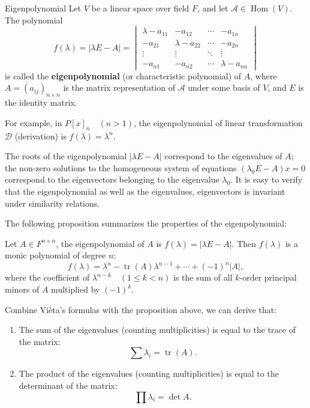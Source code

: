 \documentclass[11pt]{../../TexTemplate/elegantbook} %
\begin{document}
\begin{definition}{Eigenpolynomial}
    Let \( V \) be a linear space over field \( F \), 
    and let \( \mathcal{A}\in \operatorname{Hom}(V) \).
    The polynomial
    \[
    f(\lambda) = |\lambda E - A| = \begin{vmatrix}
        \lambda - a_{11} & -a_{12} & \cdots & -a_{1n} \\
        -a_{21} & \lambda - a_{22} & \cdots & -a_{2n} \\
        \vdots & \vdots & \ddots & \vdots \\
        -a_{n1} & -a_{n2} & \cdots & \lambda - a_{nn}
    \end{vmatrix}
    \]
    is called the \textbf{eigenpolynomial} (or characteristic polynomial) of \( A \),
    where \( A = (a_{ij})_{n\times n} \) is the matrix representation of \( \mathcal{A} \)
    under some basis of \( V \), and \( E \) is the identity matrix.
\end{definition}

\begin{remark}
    For example, in \(P[x]_{n}\quad (n>1)\), the eigenpolynomial of linear transformation \( \mathcal{D} \) (derivation)
    is \( f(\lambda) = \lambda^n \).
\end{remark}

The roots of the eigenpolynomial $\lvert \lambda E-A \rvert$ correspond to the eigenvalues of $A$; 
the non-zero solutions to the homogeneous system of equations $(\lambda_{0}E-A)x=0$ 
correspond to the eigenvectors belonging to the eigenvalue $\lambda_{0}$.
It is easy to verify that the eigenpolynomial as well as the eigenvalues, eigenvectors is invariant under similarity relations.

\vspace{0.7cm}
The following proposition summarizes the properties of the eigenpolynomial:
\begin{proposition}
    Let \( A \in F^{n \times n} \), the eigenpolynomial of \( A \) is \( f(\lambda) = |\lambda E - A| \).
    Then \( f(\lambda) \) is a monic polynomial of degree \( n \):
    \[
    f(\lambda) = \lambda^n - \operatorname{tr}(A)\lambda^{n-1} + \cdots + (-1)^n |A|,
    \]
    where the coefficient of \( \lambda^{n-k}\quad(1 \leqslant k < n) \) is 
    the sum of all \( k \)-order principal minors of \( A \) multiplied by \( (-1)^k \).  
\end{proposition}
\begin{note}
    Combine Vièta's formulas with the proposition above,
    we can derive that:
    \begin{enumerate}
        \item The sum of the eigenvalues (counting multiplicities) is equal to the trace of the matrix:
        \[
        \sum \lambda_{i} = \operatorname{tr}(A). 
        \]
        \item The product of the eigenvalues (counting multiplicities) is equal to the determinant of the matrix:
        \[
        \prod \lambda_{i} = \det A.
        \]
    \end{enumerate}
\end{note}
\end{document}
